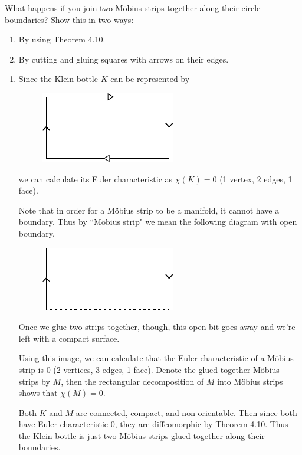 \documentclass[twoside,10pt]{report}
\begin{document}

\begin{exer}[]
	What happens if you join two M{\"o}bius strips together along their circle boundaries? Show this in two ways:
\begin{enumerate}
	\item By using Theorem 4.10.
	\item By cutting and gluing squares with arrows on their edges.
\end{enumerate}
\end{exer}

\begin{enumerate}
	\item Since the Klein bottle $K$ can be represented by
		\begin{figure}[H]
			\centering
			\includegraphics[scale=1]{fig/k.pdf}
		\end{figure}
		we can calculate its Euler characteristic as $\chi(K)=0$ (1 vertex, 2 edges, 1 face).

		Note that in order for a M\"obius strip to be a manifold, it cannot have a boundary. Thus by ``M\"obius strip" we mean the following diagram with open boundary.
		\begin{figure}[H]
			\centering
			\includegraphics[scale=1]{fig/m-open.pdf}
		\end{figure}
Once we glue two strips together, though, this open bit goes away and we're left with a compact surface.

Using this image, we can calculate that the Euler characteristic of a M\"obius strip is 0 (2 vertices, 3 edges, 1 face). Denote the glued-together M\"obius strips by $M$, then the rectangular decomposition of $M$ into M\"obius strips shows that $\chi(M)=0$.

		Both $K$ and $M$ are connected, compact, and non-orientable. Then since both have Euler characteristic 0, they are diffeomorphic by Theorem 4.10. Thus the Klein bottle is just two M\"obius strips glued together along their boundaries.


\end{enumerate}
\end{document}
